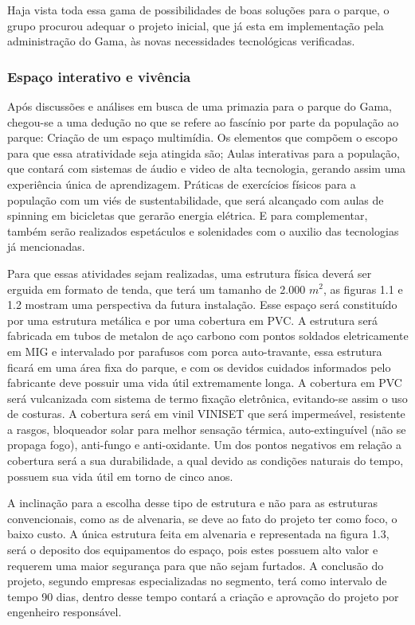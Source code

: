 	Haja vista toda essa gama de possibilidades de boas soluções para o parque, o grupo procurou adequar o projeto inicial, que já esta em implementação pela administração do Gama, às novas necessidades tecnológicas verificadas.

\subsubsection{Espaço interativo e vivência}

	Após discussões e análises em busca de uma primazia para o parque do Gama, chegou-se a uma dedução no que se refere ao fascínio por parte da população ao parque: Criação de um espaço multimídia.
Os elementos que compõem o escopo para que essa atratividade seja atingida são; Aulas interativas para a população, que contará com sistemas de áudio e video de alta tecnologia, gerando assim uma experiência única de aprendizagem. Práticas de exercícios físicos para a população com um viés de sustentabilidade, que será alcançado com aulas de spinning em bicicletas que gerarão energia elétrica. E para complementar, também serão realizados espetáculos e solenidades com o auxilio das tecnologias já mencionadas.

	Para que essas atividades sejam realizadas, uma estrutura física deverá ser erguida em formato de tenda, que terá um tamanho de 2.000 $m^{2}$, as figuras 1.1 e 1.2 mostram uma perspectiva da futura instalação. Esse espaço será constituído por uma estrutura metálica e por uma cobertura em PVC. A estrutura será fabricada em tubos de metalon de aço carbono com pontos soldados eletricamente em MIG e intervalado por parafusos com porca auto-travante, essa estrutura ficará em uma área fixa do parque, e com os devidos cuidados informados pelo fabricante deve possuir uma vida útil extremamente longa.
A cobertura em PVC será vulcanizada com sistema de termo fixação eletrônica, evitando-se assim o uso de costuras. A cobertura será em vinil VINISET que será impermeável, resistente a rasgos, bloqueador solar para melhor sensação térmica, auto-extinguível (não se propaga fogo), anti-fungo e anti-oxidante. Um dos pontos negativos em relação a cobertura será a sua durabilidade, a qual devido as condições naturais do tempo, possuem sua vida útil em torno de cinco anos.

	A inclinação para a escolha desse tipo de estrutura e não para as estruturas convencionais, como as de alvenaria, se deve ao fato do projeto ter como foco, o baixo custo. A única estrutura feita em alvenaria e representada na figura 1.3, será o deposito dos equipamentos do espaço, pois estes possuem alto valor e requerem uma maior segurança para que não sejam furtados. A conclusão do projeto, segundo empresas especializadas no segmento, terá como intervalo de tempo 90 dias, dentro desse tempo contará a criação e aprovação do projeto por engenheiro responsável.
	
